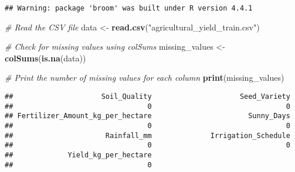 \documentclass[
]{article}
\newenvironment{Shaded}{\begin{snugshade}}{\end{snugshade}}
\newcommand{\CommentTok}[1]{\textcolor[rgb]{0.56,0.35,0.01}{\textit{#1}}}
\newcommand{\FunctionTok}[1]{\textcolor[rgb]{0.13,0.29,0.53}{\textbf{#1}}}
\newcommand{\NormalTok}[1]{#1}
\newcommand{\OtherTok}[1]{\textcolor[rgb]{0.56,0.35,0.01}{#1}}
\newcommand{\StringTok}[1]{\textcolor[rgb]{0.31,0.60,0.02}{#1}}
\begin{document}
\begin{verbatim}
## Warning: package 'broom' was built under R version 4.4.1
\end{verbatim}

\begin{Shaded}
\begin{Highlighting}[]
\CommentTok{\# Read the CSV file}
\NormalTok{data }\OtherTok{\textless{}{-}} \FunctionTok{read.csv}\NormalTok{(}\StringTok{"agricultural\_yield\_train.csv"}\NormalTok{)}

\CommentTok{\# Check for missing values using colSums}
\NormalTok{missing\_values }\OtherTok{\textless{}{-}} \FunctionTok{colSums}\NormalTok{(}\FunctionTok{is.na}\NormalTok{(data))}

\CommentTok{\# Print the number of missing values for each column}
\FunctionTok{print}\NormalTok{(missing\_values)}
\end{Highlighting}
\end{Shaded}

\begin{verbatim}
##                     Soil_Quality                     Seed_Variety 
##                                0                                0 
## Fertilizer_Amount_kg_per_hectare                       Sunny_Days 
##                                0                                0 
##                      Rainfall_mm              Irrigation_Schedule 
##                                0                                0 
##             Yield_kg_per_hectare 
##                                0
\end{verbatim}
\end{document}

